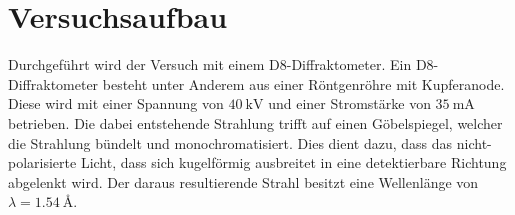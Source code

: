 \newpage
\section{Versuchsaufbau}
\label{sec:Aufbau}
Durchgeführt wird der Versuch mit einem D8-Diffraktometer.
Ein D8-Diffraktometer besteht unter Anderem aus einer Röntgenröhre mit Kupferanode. Diese wird mit einer Spannung von $\SI{40}{\kilo\volt}$ und
einer Stromstärke von $\SI{35}{\milli\ampere}$ betrieben. Die dabei entstehende Strahlung trifft auf einen Göbelspiegel, welcher die Strahlung
bündelt und monochromatisiert. Dies dient dazu, dass das nicht-polarisierte Licht, dass sich kugelförmig ausbreitet in eine
detektierbare Richtung abgelenkt wird. Der daraus resultierende Strahl besitzt eine Wellenlänge von $\lambda = \SI{1.54}{\angstrom}$.
